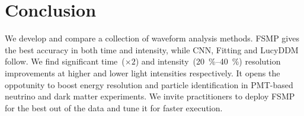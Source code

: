 \section{Conclusion}
\label{sec:conclusion}

We develop and compare a collection of waveform analysis methods.  FSMP gives the best accuracy in both time and intensity, while CNN, Fitting and LucyDDM follow.  We find significant time~($\times 2$) and intensity~(\SIrange{20}{40}{\percent}) resolution improvements at higher and lower light intensities respectively.  It opens the oppotunity to boost energy resolution and particle identification in PMT-based neutrino and dark matter experiments.  We invite practitioners to deploy FSMP for the best out of the data and tune it for faster execution.
